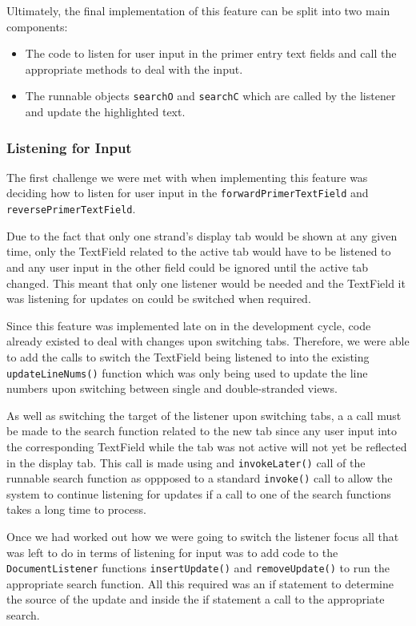 Ultimately, the final implementation of this feature can be split into
two main components:

\begin{itemize}
\item The code to listen for user input in the primer entry text fields
and call the appropriate methods to deal with the input.
\item The runnable objects \texttt{searchO} and \texttt{searchC} which
are called by the listener and update the highlighted text.
\end{itemize}

\subsubsection{Listening for Input}

The first challenge we were met with when implementing this feature was
deciding how to listen for user input in the
\texttt{forwardPrimerTextField} and \texttt{reversePrimerTextField}.

Due to the fact that only one strand's display tab would be shown at any
given time, only the TextField related to the active tab would have to
be listened to and any user input in the other field could be ignored
until the active tab changed. This meant that only one listener would be
needed and the TextField it was listening for updates on could be
switched when required.

Since this feature was implemented late on in the development cycle,
code already existed to deal with changes upon switching tabs.
Therefore, we were able to add the calls to switch the TextField being
listened to into the existing \texttt{updateLineNums()} function which
was only being used to update the line numbers upon switching between
single and double-stranded views.

As well as switching the target of the listener upon switching tabs, a
a call must be made to the search function related to the new tab
since any user input into the corresponding TextField while the tab was
not active will not yet be reflected in the display tab. This call is
made using and \texttt{invokeLater()} call of the runnable search
function as oppposed to a standard \texttt{invoke()} call to allow the
system to continue listening for updates if a call to one of the search
functions takes a long time to process.

Once we had worked out how we were going to switch the listener focus
all that was left to do in terms of listening for input was to add code
to the \texttt{DocumentListener} functions \texttt{insertUpdate()} and
\texttt{removeUpdate()} to run the appropriate search function. All this
required was an if statement to determine the source of the update and
inside the if statement a call to the appropriate search.

